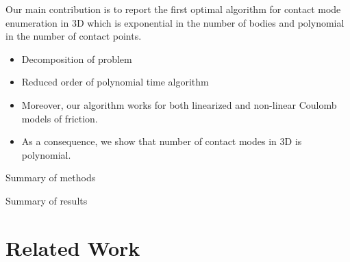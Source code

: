 \documentclass[conference]{IEEEtran}
\newcommand{\TODO}[1]{{\color{red} {{#1}}}}
\begin{document}
\begin{inparaenum}
    \item Our main contribution is to report the first \TODO{optimal}
    algorithm for contact mode enumeration in 3D which is exponential in the
    number of bodies and polynomial in the number of contact points.
    \begin{itemize}
        \item Decomposition of problem
        \item Reduced order of polynomial time algorithm
        \item Moreover, our algorithm works for both linearized and non-linear
        Coulomb models of friction.
        \item As a consequence, we show that number of contact modes in 3D is
        polynomial.
    \end{itemize}
    \item Summary of methods
    \item Summary of results
\end{inparaenum}

\section{Related Work}
\end{document}
